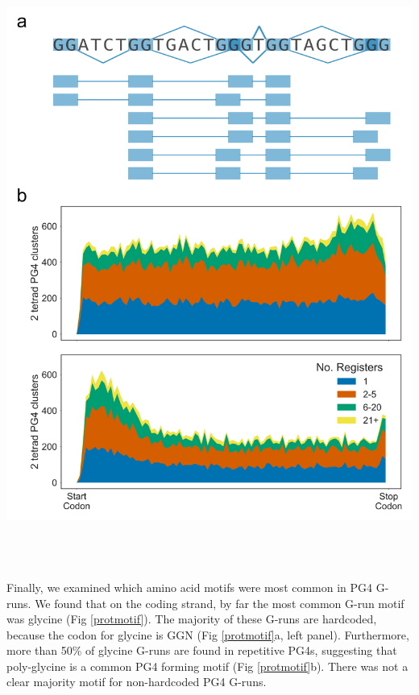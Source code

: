 \documentclass[12pt,a4paper,]{report}
\let\origfigure=\figure
\let\endorigfigure=\endfigure
\renewenvironment{figure}[1][2] {
    \expandafter\origfigure\expandafter[H]
} {
    \endorigfigure
}
\begin{document}
\begin{figure}[htbp]
\centering
\includegraphics[width=\textwidth,height=562pt,keepaspectratio]{chapter_4/figures/pg4_register.png}
\caption[PG4 Register does not vary over CDSs]{\textbf{PG4   Register   does   not   vary   over   CDSs}   \textbf{a)}   Diagram   showing   how   a   sequence   with   multiple   G-runs   can   form   multiple   overlapping   PG4   registers   and   topologies.   \textbf{b)}   Cumulative   metagene   profiles   showing   distribution   of   PG4   clusters   with   different   numbers   of   PG4   registers   on   the   coding   strand   (top   panel)   and   template   strand   (bottom   panel).   \label{g4netx}}
\end{figure}

\newpage

Finally, we examined which amino acid motifs were most common in PG4
G-runs. We found that on the coding strand, by far the most common G-run
motif was glycine (Fig \ref{protmotif}). The majority of these G-runs
are hardcoded, because the codon for glycine is GGN (Fig
\ref{protmotif}a, left panel). Furthermore, more than 50\% of glycine
G-runs are found in repetitive PG4s, suggesting that poly-glycine is a
common PG4 forming motif (Fig \ref{protmotif}b). There was not a clear
majority motif for non-hardcoded PG4 G-runs.
\end{document}
